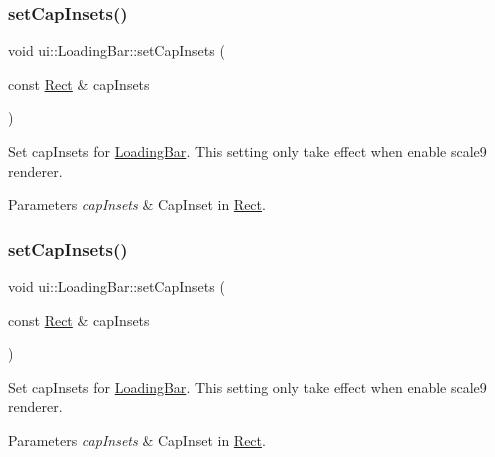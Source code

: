 \subsubsection{\texorpdfstring{set\+Cap\+Insets()}{setCapInsets()}\hspace{0.1cm}{\footnotesize\ttfamily [1/2]}}
{\footnotesize\ttfamily void ui\+::\+Loading\+Bar\+::set\+Cap\+Insets (\begin{DoxyParamCaption}\item[{const \hyperlink{classRect}{Rect} \&}]{cap\+Insets }\end{DoxyParamCaption})}

Set cap\+Insets for \hyperlink{classui_1_1LoadingBar}{Loading\+Bar}. This setting only take effect when enable scale9 renderer. 
\begin{DoxyParams}{Parameters}
{\em cap\+Insets} & Cap\+Inset in {\ttfamily \hyperlink{classRect}{Rect}}. \\
\hline
\end{DoxyParams}
\mbox{\label{classui_1_1LoadingBar_aa639bb577b731423bfce094995c61706}} 
\subsubsection{\texorpdfstring{set\+Cap\+Insets()}{setCapInsets()}\hspace{0.1cm}{\footnotesize\ttfamily [2/2]}}
{\footnotesize\ttfamily void ui\+::\+Loading\+Bar\+::set\+Cap\+Insets (\begin{DoxyParamCaption}\item[{const \hyperlink{classRect}{Rect} \&}]{cap\+Insets }\end{DoxyParamCaption})}

Set cap\+Insets for \hyperlink{classui_1_1LoadingBar}{Loading\+Bar}. This setting only take effect when enable scale9 renderer. 
\begin{DoxyParams}{Parameters}
{\em cap\+Insets} & Cap\+Inset in {\ttfamily \hyperlink{classRect}{Rect}}. \\
\hline
\end{DoxyParams}
\mbox{\label{classui_1_1LoadingBar_a66c628ef4dd8a717f7a5fad13f9306a9}} 
